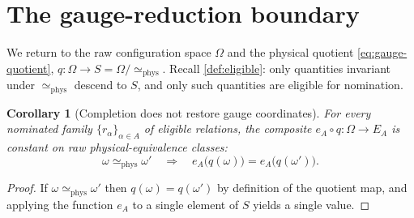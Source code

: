 \documentclass[11pt,reqno]{amsart}
\theoremstyle{plain}
\newtheorem{corollary}[theorem]{Corollary}
\theoremstyle{definition}
\theoremstyle{remark}
\numberwithin{equation}{section}
\begin{document}
\section{The gauge-reduction boundary}
\label{sec:gauge}

We return to the raw configuration space $\Omega$ and the physical quotient
\eqref{eq:gauge-quotient}, $q\colon\Omega\to S=\Omega/\!\simeq_{\mathrm{phys}}$. Recall
\cref{def:eligible}: only quantities invariant under $\simeq_{\mathrm{phys}}$ descend to $S$, and
only such quantities are eligible for nomination.

\begin{corollary}[Completion does not restore gauge coordinates]
\label{cor:gauge}
For every nominated family $\{r_\alpha\}_{\alpha\in A}$ of eligible relations, the composite
$e_A\circ q\colon\Omega\to E_A$ is constant on raw physical-equivalence classes:
\begin{equation}
\label{eq:gauge-constancy}
\omega\simeq_{\mathrm{phys}}\omega'
\quad\Longrightarrow\quad
e_A\bigl(q(\omega)\bigr)=e_A\bigl(q(\omega')\bigr).
\end{equation}
\end{corollary}

\begin{proof}
If $\omega\simeq_{\mathrm{phys}}\omega'$ then $q(\omega)=q(\omega')$ by definition of the quotient
map, and applying the function $e_A$ to a single element of $S$ yields a single value.
\end{proof}
\end{document}
